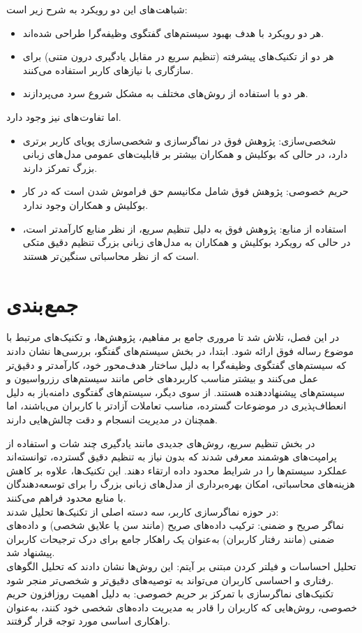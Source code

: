 شباهت های این دو رویکرد به شرح زیر است:
\begin{itemize}
\item
هر دو رویکرد با هدف بهبود سیستم‌های گفتگوی وظیفه‌گرا طراحی شده‌اند. 
\item
هر دو از تکنیک‌های پیشرفته (تنظیم سریع در مقابل یادگیری درون متنی) برای سازگاری با نیازهای کاربر استفاده می‌کنند. 
\item
هر دو با استفاده از روش‌های مختلف به مشکل شروع سرد می‌پردازند.
\end{itemize}


اما تفاوت های نیز وجود دارد.
\begin{itemize}
\item
شخصی‌سازی: پژوهش فوق در نماگرسازی و شخصی‌سازی پویای کاربر برتری دارد، در حالی که بوکلیش و همکاران بیشتر بر قابلیت‌های عمومی مدل های زبانی بزرگ تمرکز دارند.
\item
حریم خصوصی: پژوهش فوق  شامل مکانیسم حق فراموش شدن است که در کار بوکلیش و همکاران وجود ندارد.
\item
استفاده از منابع: پژوهش فوق به دلیل تنظیم سریع، از نظر منابع کارآمدتر است، در حالی که رویکرد بوکلیش و همکاران به مدل های زبانی بزرگ تنظیم دقیق متکی است که از نظر محاسباتی سنگین تر هستند.
\end{itemize}

 

\section{جمع بندی}
در این فصل، تلاش شد تا مروری جامع بر مفاهیم، پژوهش‌ها، و تکنیک‌های مرتبط با موضوع رساله فوق ارائه شود. ابتدا، در بخش سیستم‌های گفتگو، بررسی‌ها نشان دادند که سیستم‌های گفتگوی وظیفه‌گرا به دلیل ساختار هدف‌محور خود، کارآمدتر و دقیق‌تر عمل می‌کنند و بیشتر مناسب کاربردهای خاص مانند سیستم‌های رزرواسیون و سیستم‌های پیشنهاددهنده هستند. 
از سوی دیگر، سیستم‌های گفتگوی دامنه‌باز به دلیل انعطاف‌پذیری در موضوعات گسترده، مناسب تعاملات آزادتر با کاربران می‌باشند، اما همچنان در مدیریت انسجام و دقت چالش‌هایی دارند.
\newline

در بخش تنظیم سریع، روش‌های جدیدی مانند یادگیری چند شات و استفاده از پرامپت‌های هوشمند معرفی شدند که بدون نیاز به تنظیم دقیق گسترده، توانسته‌اند عملکرد سیستم‌ها را در شرایط محدود داده ارتقاء دهند. این تکنیک‌ها، علاوه بر کاهش هزینه‌های محاسباتی، امکان بهره‌برداری از مدل‌های زبانی بزرگ را برای توسعه‌دهندگان با منابع محدود فراهم می‌کنند.\\
در حوزه نماگر‌سازی کاربر، سه دسته اصلی از تکنیک‌ها تحلیل شدند:\\
نماگر صریح و ضمنی: ترکیب داده‌های صریح (مانند سن یا علایق شخصی) و داده‌های ضمنی (مانند رفتار کاربران) به‌عنوان یک راهکار جامع برای درک ترجیحات کاربران پیشنهاد شد.  \\
تحلیل احساسات و فیلتر کردن مبتنی بر آیتم: این روش‌ها نشان دادند که تحلیل الگوهای رفتاری و احساسی کاربران می‌تواند به توصیه‌های دقیق‌تر و شخصی‌تر منجر شود.  \\
تکنیک‌های نماگر‌سازی با تمرکز بر حریم خصوصی: به دلیل اهمیت روزافزون حریم خصوصی، روش‌هایی که کاربران را قادر به مدیریت داده‌های شخصی خود کنند، به‌عنوان راهکاری اساسی مورد توجه قرار گرفتند.

